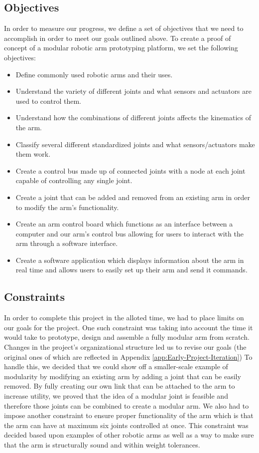 \subsection{Objectives}
\noindent In order to measure our progress, we define a set of objectives that we need to accomplish in order to meet our goals outlined above. To create a proof of concept of a modular robotic arm prototyping platform, we set the following objectives: 
\begin{itemize}
\item Define commonly used robotic arms and their uses.
\item Understand the variety of different joints and what sensors and actuators are used to control them.
\item Understand how the combinations of different joints affects the kinematics of the arm.
\item Classify several different standardized joints and what sensors/actuators make them work.
\item Create a control bus made up of connected joints with a node at each joint capable of controlling any single joint.
\item Create a joint that can be added and removed from an existing arm in order to modify the arm's functionality.
\item Create an arm control board which functions as an interface between a computer and our arm's control bus allowing for users to interact with the arm through a software interface.
\item Create a software application which displays information about the arm in real time and allows users to easily set up their arm and send it commands.
\end{itemize} 

\subsection{Constraints}
\noindent In order to complete this project in the alloted time, we had to place limits on our goals for the project. One such constraint was taking into account the time it would take to prototype, design and assemble a fully modular arm from scratch. Changes in the project's organizational structure led us to revise our goals (the original ones of which are reflected in Appendix \ref{app:Early-Project-Iteration}) To handle this, we decided that we could show off a smaller-scale example of modularity by modifying an existing arm by adding a joint that can be easily removed. By fully creating our own link that can be attached to the arm to increase utility, we proved that the idea of a modular joint is feasible and therefore those joints can be combined to create a modular arm. We also had to impose another constraint to ensure proper functionality of the arm which is that the arm can have at maximum six joints controlled at once. This constraint was decided based upon examples of other robotic arms as well as a way to make sure that the arm is structurally sound and within weight tolerances.

